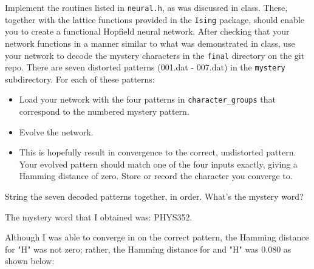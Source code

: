 \begin{qBox}{1}
Implement the routines listed in \texttt{neural.h}, as was discussed in class. 
These, together with the lattice functions provided in the \texttt{Ising} package,
should enable you to create a functional Hopfield neural network.
After checking that your network functions in a manner similar to what was demonstrated in class, use your network to decode the mystery characters in the \texttt{final}
directory on the git repo.
There are seven distorted patterns (001.dat - 007.dat) in the \texttt{mystery}
subdirectory.
For each of these patterns: 

\begin{itemize}
    \item Load your network with the four patterns in \texttt{character\_groups} that 
        correspond to the numbered mystery pattern.
    \item Evolve the network.
    \item This is hopefully result in convergence to the correct, undistorted pattern.
        Your evolved pattern should match one of the four inputs exactly, giving a 
        Hamming distance of zero. Store or record the character you converge to.
\end{itemize}

String the seven decoded patterns together, in order. What's the mystery word?

\tcblower

The mystery word that I obtained was: PHYS352.
\baseSkip 

Although I was able to converge in on the correct pattern, the Hamming distance for 
"H" was not zero; rather, the Hamming distance for and "H" was \( 0.080 \) as shown below:


\end{qBox}
